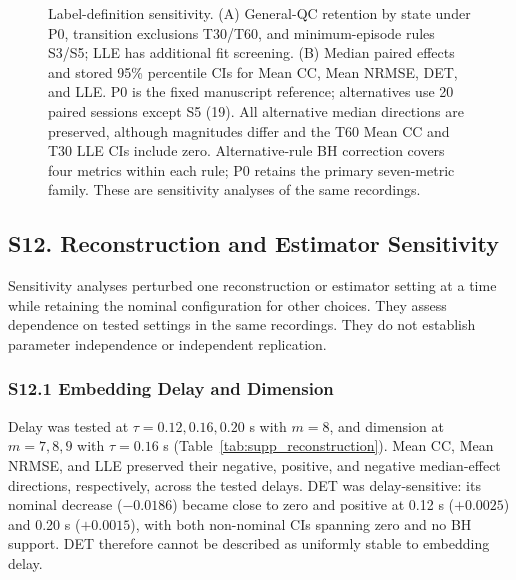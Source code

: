 \begin{figure}[p]
\centering
{}
\caption{Label-definition sensitivity. (A) General-QC retention by state under P0, transition exclusions T30/T60, and minimum-episode rules S3/S5; LLE has additional fit screening. (B) Median paired effects and stored 95\% percentile CIs for Mean CC, Mean NRMSE, DET, and LLE. P0 is the fixed manuscript reference; alternatives use 20 paired sessions except S5 (19). All alternative median directions are preserved, although magnitudes differ and the T60 Mean CC and T30 LLE CIs include zero. Alternative-rule BH correction covers four metrics within each rule; P0 retains the primary seven-metric family. These are sensitivity analyses of the same recordings.}
\label{fig:supp_label}
\end{figure}
\subsection*{S12. Reconstruction and Estimator Sensitivity}
Sensitivity analyses perturbed one reconstruction or estimator setting at a time while retaining the nominal configuration for other choices. They assess dependence on tested settings in the same recordings. They do not establish parameter independence or independent replication.

\subsubsection*{S12.1 Embedding Delay and Dimension}
Delay was tested at $\tau=0.12,0.16,0.20$ s with $m=8$, and dimension at $m=7,8,9$ with $\tau=0.16$ s (Table~\ref{tab:supp_reconstruction}). Mean CC, Mean NRMSE, and LLE preserved their negative, positive, and negative median-effect directions, respectively, across the tested delays. DET was delay-sensitive: its nominal decrease ($-0.0186$) became close to zero and positive at 0.12 s ($+0.0025$) and 0.20 s ($+0.0015$), with both non-nominal CIs spanning zero and no BH support. DET therefore cannot be described as uniformly stable to embedding delay.

